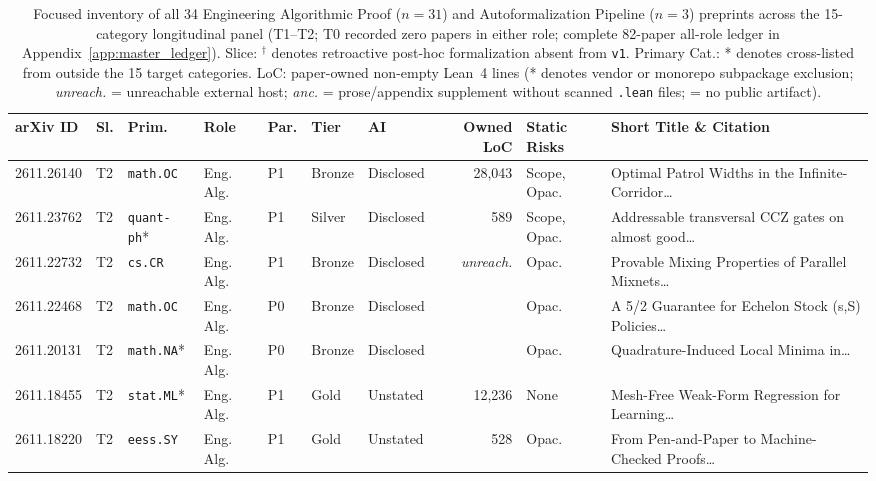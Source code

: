 \documentclass[11pt,letterpaper]{article}
\begin{document}
\begin{table}[p]
\centering
\caption{Focused inventory of all 34 Engineering Algorithmic Proof ($n=31$) and Autoformalization Pipeline ($n=3$) preprints across the 15-category longitudinal panel (T1--T2; T0 recorded zero papers in either role; complete 82-paper all-role ledger in Appendix~\ref{app:master_ledger}). Slice: $^\dagger$ denotes retroactive post-hoc formalization absent from \texttt{v1}. Primary Cat.: * denotes cross-listed from outside the 15 target categories. LoC: paper-owned non-empty Lean~4 lines (* denotes vendor or monorepo subpackage exclusion; \emph{unreach.} = unreachable external host; \emph{anc.} = prose/appendix supplement without scanned \texttt{.lean} files; \textemdash{} = no public artifact).}
\label{tab:inventory_eng}
\tiny
\setlength{\tabcolsep}{2.1pt}
\begin{tabularx}{\textwidth}{lllllllrlX}
\toprule
\textbf{arXiv ID} & \textbf{Sl.} & \textbf{Prim.} & \textbf{Role} & \textbf{Par.} & \textbf{Tier} & \textbf{AI} & \textbf{Owned LoC} & \textbf{Static Risks} & \textbf{Short Title \& Citation} \\
\midrule
2611.26140 & T2 & \texttt{math.OC} & Eng. Alg. & P1 & Bronze & Disclosed & 28,043 & Scope, Opac. & Optimal Patrol Widths in the Infinite-Corridor\dots~\cite{arxiv2611_26140} \\
2611.23762 & T2 & \texttt{quant-ph}* & Eng. Alg. & P1 & Silver & Disclosed & 589 & Scope, Opac. & Addressable transversal CCZ gates on almost good\dots~\cite{arxiv2611_23762} \\
2611.22732 & T2 & \texttt{cs.CR} & Eng. Alg. & P1 & Bronze & Disclosed & \emph{unreach.} & Opac. & Provable Mixing Properties of Parallel Mixnets\dots~\cite{arxiv2611_22732} \\
2611.22468 & T2 & \texttt{math.OC} & Eng. Alg. & P0 & Bronze & Disclosed & \textemdash{} & Opac. & A 5/2 Guarantee for Echelon Stock (s,S) Policies\dots~\cite{arxiv2611_22468} \\
2611.20131 & T2 & \texttt{math.NA}* & Eng. Alg. & P0 & Bronze & Disclosed & \textemdash{} & Opac. & Quadrature-Induced Local Minima in\dots~\cite{arxiv2611_20131} \\
2611.18455 & T2 & \texttt{stat.ML}* & Eng. Alg. & P1 & Gold & Unstated & 12,236 & None & Mesh-Free Weak-Form Regression for Learning\dots~\cite{arxiv2611_18455} \\
2611.18220 & T2 & \texttt{eess.SY} & Eng. Alg. & P1 & Gold & Unstated & 528 & Opac. & From Pen-and-Paper to Machine-Checked Proofs\dots~\cite{arxiv2611_18220} \\

\end{tabularx}
\end{table}
\end{document}
